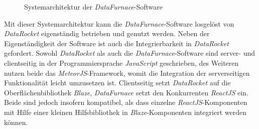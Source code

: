 \documentclass[
  language=german, %
  type=bachelor,%
  ngerman
]{isthesis}
\begin{document}
\begin{content}
\begin{figure}
    \caption{Systemarchitektur der \textit{DataFurnace}-Software}\label{fig:systemarchitektur}
	\end{figure}

  Mit dieser Systemarchitektur kann die \textit{DataFurnace}-Software losgelöst
  von \textit{DataRocket} eigenständig betrieben und genutzt werden. Neben der
  Eigenständigkeit der Software ist auch die Integrierbarkeit in
  \textit{DataRocket} gefordert. Sowohl \textit{DataRocket} als auch die
  \textit{DataFurnace}-Software sind server- und clientseitig in der
  Programmiersprache \textit{JavaScript} geschrieben, des Weiteren nutzen beide
  das \textit{MeteorJS}-Framework, womit die Integration der serverseitigen
  Funktionalität leicht umzusetzen ist. Clientseitig setzt \textit{DataRocket}
  auf die Oberflächenbibliothek \textit{Blaze}, \textit{DataFurnace} setzt den
  Konkurrenten \textit{ReactJS} ein. Beide sind jedoch insofern kompatibel, als
  dass einzelne \textit{ReactJS}-Komponenten mit Hilfe einer kleinen
  Hilfsbibliothek in \textit{Blaze}-Komponenten integriert werden können.





\end{content}
\end{document}
